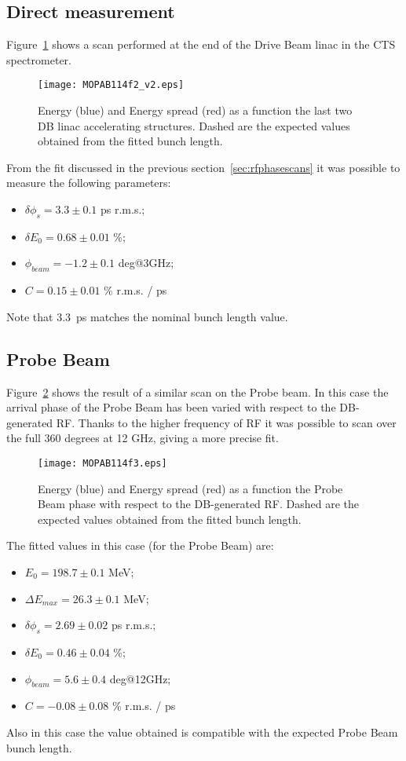 \subsection{Direct measurement}
%
Figure~\ref{fig:scanDriveBeam} shows a scan performed at the end of the Drive Beam linac in 
the CTS spectrometer.
%
\begin{figure}[htb]
   \centering
   \texttt{[image: MOPAB114f2\_v2.eps]}
   \caption{Energy (blue) and Energy spread (red) as a function the last two 
            DB linac accelerating structures. Dashed are the expected values obtained from 
            the fitted bunch length.}
   \label{fig:scanDriveBeam}
\end{figure}
%
From the fit discussed in the previous section~\ref{sec:rfphasescans} it was possible to measure the following parameters:
%
\begin{itemize}
\item
$\delta\phi_{s} = 3.3 \pm 0.1$ ps r.m.s.; 
 \item
$\delta E_0 = 0.68 \pm 0.01$ \%;
\item 
$\phi_{beam} = -1.2 \pm 0.1$ deg@3GHz;
\item 
$C = 0.15 \pm 0.01$ \% r.m.s. / ps 
\end{itemize}
%
Note that 3.3~ps matches the nominal bunch length value.

\subsection{Probe Beam}
Figure~\ref{fig:scanProbeBeam} shows the result of a similar scan on the Probe beam.
In this case the arrival phase of the Probe Beam has been varied with respect to the DB-generated RF. 
Thanks to the higher frequency of RF it was possible to scan over the full 360 degrees at 12 GHz, 
giving a more precise fit.
%
\begin{figure}[htb]
   \centering
   \texttt{[image: MOPAB114f3.eps]}
   \caption{Energy (blue) and Energy spread (red) as a function the Probe Beam phase with respect to 
            the DB-generated RF. Dashed are the expected values obtained from the fitted bunch length.}
   \label{fig:scanProbeBeam}
\end{figure}
%
The fitted values in this case (for the Probe Beam) are:
%
\begin{itemize}
\item
$E_0 = 198.7 \pm 0.1$ MeV; 
\item
$\Delta E_{max} = 26.3 \pm 0.1$ MeV; 
%
\item
$\delta\phi_{s} = 2.69 \pm 0.02$ ps r.m.s.; 
 \item
$\delta E_0 = 0.46 \pm 0.04$ \%;
\item 
$\phi_{beam} = 5.6 \pm 0.4$ deg@12GHz;
\item 
$C = -0.08 \pm 0.08$ \% r.m.s. / ps 
\end{itemize}
%
%
Also in this case the value obtained is compatible with the expected Probe Beam bunch length.


